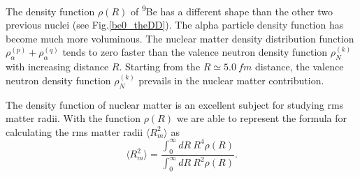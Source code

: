 \documentclass[
12pt, %
oneside, %
english, %
onehalfspacing, %
onehalfspacing, %
headsepline, %
]{MastersDoctoralThesis} %
\newcommand{\be}{\textsuperscript{9}Be\xspace}
\begin{document}
The density function $\rho(R)$ of \be has a different shape than the other two previous nuclei (see Fig.\ref{be0_theDD}). The alpha particle density function has become much more voluminous. The nuclear matter density distribution function $\rho_{\alpha}^{(p)}+\rho_{\alpha}^{(q)}$ tends to zero faster than the valence neutron density function $\rho_{N}^{(k)}$ with increasing distance $R$. Starting from the $R \simeq 5.0~fm $ distance, the valence neutron density function $\rho_{N}^{(k)}$  prevails in the nuclear matter contribution. 

The density function of nuclear matter is an excellent subject for studying rms matter radii. With the function $\rho(R)$ we are able to represent the formula for calculating the rms matter radii  $\langle R_{m}^2 \rangle$ as
\begin{equation}
\langle R_{m}^2 \rangle = 
\frac{
\int_0^{\infty} dR~ R^{4} \rho(R)
}{
\int_0^{\infty} dR~ R^{2} \rho(R)
}.
\end{equation}
\end{document}
